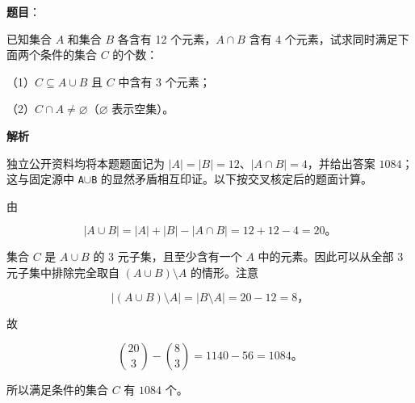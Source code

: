 \begin{answer}

\textbf{题目}：

已知集合 $A$ 和集合 $B$ 各含有 12 个元素，$A\cap B$ 含有 4 个元素，试求同时满足下面两个条件的集合 $C$ 的个数：

（1）$C\subseteq A\cup B$ 且 $C$ 中含有 3 个元素；

（2）$C\cap A\ne\varnothing$（$\varnothing$ 表示空集）。

\textbf{解析}

独立公开资料均将本题题面记为 $|A|=|B|=12$、$|A\cap B|=4$，并给出答案 $1084$；这与固定源中 \texttt{A$\cup$B} 的显然矛盾相互印证。以下按交叉核定后的题面计算。

由

\nopagebreak[4]
\[
|A\cup B|=|A|+|B|-|A\cap B|=12+12-4=20\text{。}
\]

集合 $C$ 是 $A\cup B$ 的 3 元子集，且至少含有一个 $A$ 中的元素。因此可以从全部 3 元子集中排除完全取自 $(A\cup B)\setminus A$ 的情形。注意

\nopagebreak[4]
\[
|(A\cup B)\setminus A|=|B\setminus A|=20-12=8\text{，}
\]

故

\nopagebreak[4]
\[
\binom{20}{3}-\binom{8}{3}=1140-56=1084\text{。}
\]

所以满足条件的集合 $C$ 有 $1084$ 个。


\end{answer}
